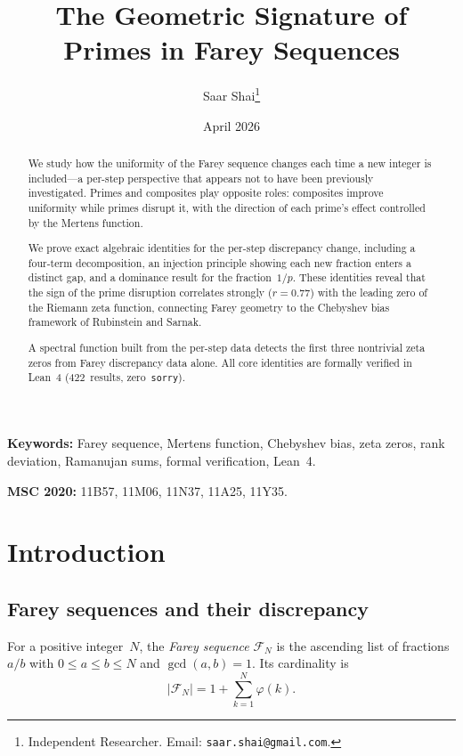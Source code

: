\documentclass[11pt]{article}
\title{The Geometric Signature of Primes in Farey Sequences}
\author{
  Saar Shai\thanks{Independent Researcher. Email: \texttt{saar.shai@gmail.com}.}
}
\date{April 2026}
\theoremstyle{definition}
\newcommand{\F}{\mathcal{F}}
\begin{document}
\maketitle

\begin{abstract}
We study how the uniformity of the Farey sequence changes
each time a new integer is included---a per-step perspective
that appears not to have been previously investigated.
Primes and composites play opposite roles: composites
improve uniformity while primes disrupt it, with the
direction of each prime's effect controlled by the
Mertens function.

We prove exact algebraic identities for the per-step
discrepancy change, including a four-term decomposition,
an injection principle showing each new fraction enters
a distinct gap, and a dominance result for the
fraction~$1/p$.  These identities reveal that the sign
of the prime disruption correlates strongly ($r = 0.77$)
with the leading zero of the Riemann zeta function,
connecting Farey geometry to the Chebyshev bias framework
of Rubinstein and Sarnak.

A spectral function built from the per-step data detects
the first three nontrivial zeta zeros from Farey
discrepancy data alone.  All core identities are formally
verified in Lean~4 (422~results, zero~\texttt{sorry}).
\end{abstract}

\medskip
\noindent\textbf{Keywords:} Farey sequence, Mertens function, Chebyshev bias,
zeta zeros, rank deviation, Ramanujan sums, formal verification, Lean~4.

\noindent\textbf{MSC 2020:} 11B57, 11M06, 11N37, 11A25, 11Y35.

\section{Introduction}\label{sec:intro}

\subsection{Farey sequences and their discrepancy}

For a positive integer~$N$, the \emph{Farey sequence} $\F_N$ is the
ascending list of fractions $a/b$ with $0 \le a \le b \le N$ and
$\gcd(a,b) = 1$.  Its cardinality is
\begin{equation}
  |\F_N| = 1 + \sum_{k=1}^{N} \varphi(k).
\end{equation}
\end{document}
